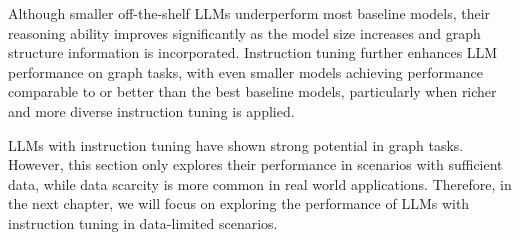 
\begin{remark}
   Although smaller off-the-shelf LLMs underperform most baseline models, their reasoning ability improves significantly as the model size increases and graph structure information is incorporated. Instruction tuning further enhances LLM performance on graph tasks, with even smaller models achieving performance comparable to or better than the best baseline models, particularly when richer and more diverse instruction tuning is applied.
\end{remark}

\vspace{\baselineskip}
LLMs with instruction tuning have shown strong potential in graph tasks. However, this section only explores their performance in scenarios with sufficient data, while data scarcity is more common in real world applications. Therefore, in the next chapter, we will focus on exploring the performance of LLMs with instruction tuning in data-limited scenarios.



